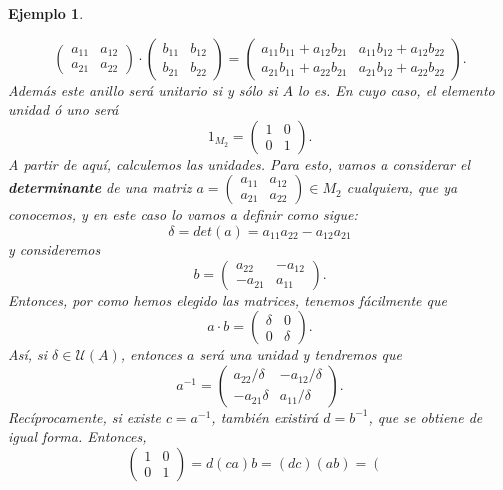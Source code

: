 \documentclass[12pt]{article}
\newtheorem{example}{Ejemplo}[theorem]
\begin{document}
\begin{example}
\begin{enumerate}
$$\left(
\begin{matrix}
a_{11} & a_{12} \\
a_{21} & a_{22}
\end{matrix}
\right) \cdot \left(
\begin{matrix}
b_{11} & b_{12} \\
b_{21} & b_{22}
\end{matrix}
\right) = \left(
\begin{matrix}
a_{11}b_{11} + a_{12}b_{21} & a_{11}b_{12} + a_{12}b_{22}\\
a_{21}b_{11} + a_{22}b_{21} & a_{21}b_{12} + a_{22}b_{22}
\end{matrix}
\right).$$
Además este anillo será unitario si y sólo si $A$ lo es. En cuyo caso, el elemento unidad ó uno será $$1_{M_{2}} =  \left(
\begin{matrix}
1 & 0 \\
0 & 1
\end{matrix} 
\right).$$ A partir de aquí, calculemos las unidades. Para esto, vamos a considerar el \textbf{determinante} de una matriz $a =\left(
\begin{matrix}
a_{11} & a_{12} \\
a_{21} & a_{22}
\end{matrix}
\right) \in M_{2}$ cualquiera, que ya conocemos, y en este caso lo vamos a definir como sigue: $$\delta = det(a) =a_{11}a_{22} -a_{12}a_{21}$$ y consideremos $$b = \left(
\begin{matrix}
a_{22} & -a_{12} \\
-a_{21} & a_{11}
\end{matrix}
\right).$$ Entonces, por como hemos elegido las matrices, tenemos fácilmente que $$a\cdot b = \left(
\begin{matrix}
\delta & 0 \\
0 & \delta
\end{matrix}
\right).$$ Así, si $\delta \in \mathcal{U}(A)$, entonces $a$ será una unidad y tendremos que $$a^{-1} = \left(
\begin{matrix}
a_{22}/\delta & -a_{12}/\delta \\
-a_{21}\delta & a_{11}/\delta
\end{matrix}
\right).$$ Recíprocamente, si existe $c = a^{-1}$, también existirá $d = b^{-1}$, que se  obtiene de igual forma. Entonces, $$\left(
\begin{matrix}
1 & 0 \\
0 & 1
\end{matrix} 
\right) = d(ca)b = (dc)(ab) = \left( \begin{matrix}

\end{matrix}$$
\end{enumerate}
\end{example}
\end{document}
